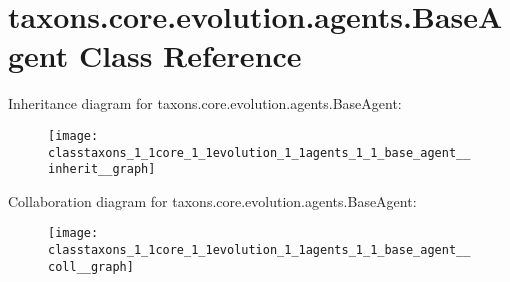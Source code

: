 \hypertarget{classtaxons_1_1core_1_1evolution_1_1agents_1_1_base_agent}{}\section{taxons.\+core.\+evolution.\+agents.\+Base\+Agent Class Reference}
\label{classtaxons_1_1core_1_1evolution_1_1agents_1_1_base_agent}


Inheritance diagram for taxons.\+core.\+evolution.\+agents.\+Base\+Agent\+:
\nopagebreak
\begin{figure}[H]
\begin{center}
\leavevmode
\texttt{[image: classtaxons\_1\_1core\_1\_1evolution\_1\_1agents\_1\_1\_base\_agent\_\_inherit\_\_graph]}
\end{center}
\end{figure}


Collaboration diagram for taxons.\+core.\+evolution.\+agents.\+Base\+Agent\+:
\nopagebreak
\begin{figure}[H]
\begin{center}
\leavevmode
\texttt{[image: classtaxons\_1\_1core\_1\_1evolution\_1\_1agents\_1\_1\_base\_agent\_\_coll\_\_graph]}
\end{center}
\end{figure}
